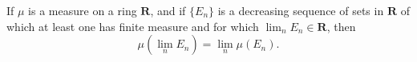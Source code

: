 If $\mu$ is a measure on a ring $\mathbf{R}$, and if $\{E_n\}$ is a decreasing sequence of sets in $\mathbf{R}$ of which at least one has finite measure and for which $\lim_n E_n \in \mathbf{R}$, then
$$\mu(\lim_n E_n) = \lim_n \mu(E_n).$$
